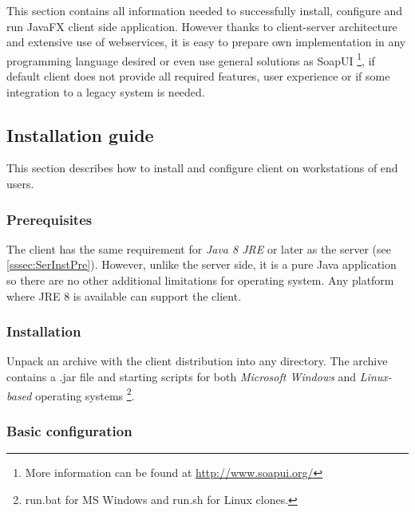 
This section contains all information needed to successfully install, configure
and run \textan{} JavaFX client side application. However thanks to \textan{}
client-server architecture and extensive use of webservices, it is easy to
prepare own implementation in any programming language desired or even use
general solutions as SoapUI%
\footnote{More information can be found at \url{http://www.soapui.org/}},
if \textan{} default client does not provide all required features, user
experience or if some integration to a legacy system is needed.

\subsection{Installation guide}

This section describes how to install and configure \textan{} client on
workstations of end users.

\subsubsection{Prerequisites}

The \textan{} client has the same requirement for \emph{Java 8 JRE} or later
as the server (see \ref{sssec:SerInstPre}). However, unlike the server side,
it is a pure Java application so there are no other additional limitations for
operating system. Any platform where JRE 8 is available can support the
client.

\subsubsection{Installation}

Unpack an archive with the \textan{} client distribution into any directory. 
The archive contains a .jar file and starting scripts for both
\emph{Microsoft Windows} and \emph{Linux-based} operating systems
\footnote{run.bat for MS Windows and run.sh for Linux clones.\label{runscript_note}}.

\subsubsection{Basic configuration}
\label{sssec:BasicConf}

